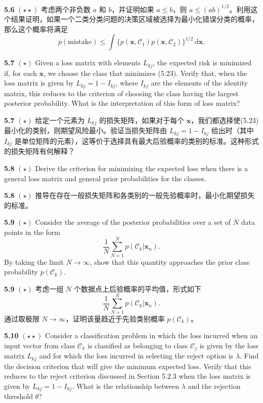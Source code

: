 \documentclass{article}
\begin{document}
\textbf{5.6} $(\star\star)$ 考虑两个非负数 $a$ 和 $b$，并证明如果 $a \leqslant b$，则 $a \leqslant (ab)^{1/2}$。利用这个结果证明，如果一个二类分类问题的决策区域被选择为最小化错误分类的概率，那么这个概率将满足
\begin{equation}
p(\text{mistake}) \leqslant \int \{p(\mathbf{x}, \mathcal{C}_1)p(\mathbf{x}, \mathcal{C}_2)\}^{1/2} \,\mathrm{d}\mathbf{x}. \tag{5.99}
\end{equation}


\textbf{5.7} $(\star)$ Given a loss matrix with elements $L_{kj}$, the expected risk is minimized if, for each $\mathbf{x}$, we choose the class that minimizes (5.23). Verify that, when the loss matrix is given by $L_{kj} = 1 - I_{kj}$, where $I_{kj}$ are the elements of the identity matrix, this reduces to the criterion of choosing the class having the largest posterior probability. What is the interpretation of this form of loss matrix?

\textbf{5.7} $(\star)$ 给定一个元素为 $L_{kj}$ 的损失矩阵，如果对于每个 $\mathbf{x}$，我们都选择使(5.23)最小化的类别，则期望风险最小。验证当损失矩阵由 $L_{kj} = 1 - I_{kj}$ 给出时（其中 $I_{kj}$ 是单位矩阵的元素），这等价于选择具有最大后验概率的类别的标准。这种形式的损失矩阵有何解释？


\textbf{5.8} $(\star)$ Derive the criterion for minimizing the expected loss when there is a general loss matrix and general prior probabilities for the classes.

\textbf{5.8} $(\star)$ 推导在存在一般损失矩阵和各类别的一般先验概率时，最小化期望损失的标准。


\textbf{5.9} $(\star)$ Consider the average of the posterior probabilities over a set of $N$ data points in the form
\begin{equation}
\frac{1}{N} \sum_{N=1}^{N} p(\mathcal{C}_k|\mathbf{x}_n). \tag{5.100}
\end{equation}
By taking the limit $N \to \infty$, show that this quantity approaches the prior class probability $p(\mathcal{C}_k)$.

\textbf{5.9} $(\star)$ 考虑一组 $N$ 个数据点上后验概率的平均值，形式如下
\begin{equation}
\frac{1}{N} \sum_{N=1}^{N} p(\mathcal{C}_k|\mathbf{x}_n). \tag{5.100}
\end{equation}
通过取极限 $N \to \infty$，证明该量趋近于先验类别概率 $p(\mathcal{C}_k)$。


\textbf{5.10} $(\star\star)$ Consider a classification problem in which the loss incurred when an input vector from class $\mathcal{C}_k$ is classified as belonging to class $\mathcal{C}_j$ is given by the loss matrix $L_{kj}$ and for which the loss incurred in selecting the reject option is $\lambda$. Find the decision criterion that will give the minimum expected loss. Verify that this reduces to the reject criterion discussed in Section 5.2.3 when the loss matrix is given by $L_{kj} = 1 - I_{kj}$. What is the relationship between $\lambda$ and the rejection threshold $\theta$?
\end{document}
